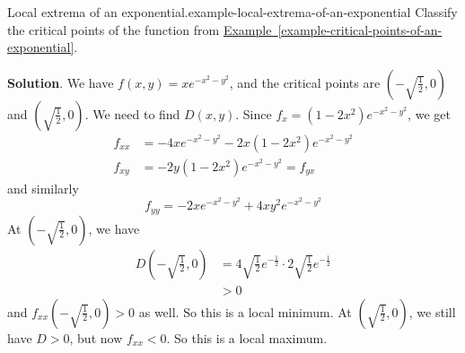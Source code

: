 \documentclass[10pt,]{book}
\numberwithin{equation}{section}
\begin{document}
\begin{example}{Local extrema of an exponential.}{example-local-extrema-of-an-exponential}%
\hypertarget{p-1426}{}%
Classify the critical points of the function from \hyperref[example-critical-points-of-an-exponential]{Example~\ref{example-critical-points-of-an-exponential}}.%
\par\smallskip%
\noindent\textbf{Solution}.\hypertarget{solution-232}{}\quad%
\hypertarget{p-1427}{}%
We have \(f(x,y) = xe^{-x^{2} - y^{2}}\), and the critical points are \((-\sqrt{\frac{1}{2}},0)\) and \((\sqrt{\frac{1}{2}},0)\). We need to find \(D(x,y)\). Since \(f_{x} = (1 - 2x^{2})e^{-x^{2} - y^{2}}\), we get%
\begin{align*}
f_{xx} & = -4xe^{-x^{2} - y^{2}} - 2x(1 - 2x^{2})e^{-x^{2} - y^{2}} \\
f_{xy} & = -2y(1-2x^{2})e^{-x^{2} - y^{2}} = f_{yx} 
\end{align*}
and similarly%
\begin{equation*}
f_{yy} = -2xe^{-x^{2} - y^{2}} + 4xy^{2}e^{-x^{2} - y^{2}}
\end{equation*}
At \((-\sqrt{\frac{1}{2}},0)\), we have%
\begin{align*}
D\left(-\sqrt{\frac{1}{2}},0\right) & = 4\sqrt{\frac{1}{2}}e^{-\frac{1}{2}}\cdot2\sqrt{\frac{1}{2}}e^{-\frac{1}{2}}\\
& > 0 
\end{align*}
and \(f_{xx}(-\sqrt{\frac{1}{2}},0) >0\) as well. So this is a local minimum. At \((\sqrt{\frac{1}{2}},0)\), we still have \(D>0\), but now \(f_{xx}<0\). So this is a local maximum.%
\end{example}
%
%
\typeout{************************************************}
\typeout{************************************************}
%
\end{document}
